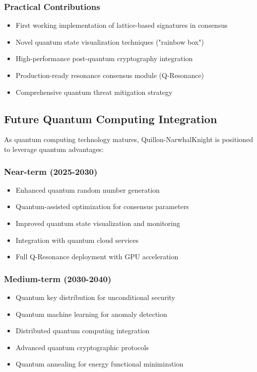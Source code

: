 \documentclass[11pt,a4paper]{article}
\begin{document}
\subsubsection{Practical Contributions}
\begin{itemize}
    \item First working implementation of lattice-based signatures in consensus
    \item Novel quantum state visualization techniques ("rainbow box")
    \item High-performance post-quantum cryptography integration
    \item Production-ready resonance consensus module (Q-Resonance)
    \item Comprehensive quantum threat mitigation strategy
\end{itemize}

\subsection{Future Quantum Computing Integration}

As quantum computing technology matures, Quillon-NarwhalKnight is positioned to leverage quantum advantages:

\subsubsection{Near-term (2025-2030)}
\begin{itemize}
    \item Enhanced quantum random number generation
    \item Quantum-assisted optimization for consensus parameters
    \item Improved quantum state visualization and monitoring
    \item Integration with quantum cloud services
    \item Full Q-Resonance deployment with GPU acceleration
\end{itemize}

\subsubsection{Medium-term (2030-2040)}
\begin{itemize}
    \item Quantum key distribution for unconditional security
    \item Quantum machine learning for anomaly detection
    \item Distributed quantum computing integration
    \item Advanced quantum cryptographic protocols
    \item Quantum annealing for energy functional minimization
\end{itemize}
\end{document}
